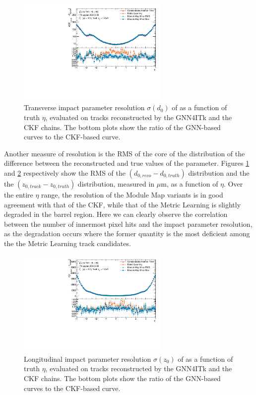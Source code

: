 \begin{figure}[h!]
\centering
    \centering
    \includegraphics[width=0.65\textwidth]{figures/ckf-gnn/Matched/Resolutions/Primary/resolution_vs_eta_d0.pdf}
    \caption{  Transverse impact parameter resolution $\sigma(d_0)$ of as a function of truth $\eta$, evaluated on tracks reconstructed by the GNN4ITk and the CKF chains. The bottom plots show the ratio of the GNN-based curves to the CKF-based curve. }
    \label{fig:res-vs-eta-d0}
\end{figure}

Another measure of resolution is the RMS of the core of the distribution of the difference between the reconstructed and true values of the parameter. 
Figures \ref{fig:res-vs-eta-d0} and \ref{fig:res-vs-eta-z0} respectively show the RMS of the $(d_{0,reco} - d_{0,truth})$ distribution and the the $(z_{0,track} - z_{0,truth})$ distribution, measured in $\mu$m, as a function of $\eta$. 
Over the entire $\eta$ range, the resolution of the Module Map variants is in good agreement with that of the CKF, while that of the Metric Learning is slightly degraded in the barrel region. 
Here we can clearly observe the correlation between the number of innermost pixel hits and the impact parameter resolution, as the degradation occurs where the former quantity is the most deficient among the the Metric Learning track candidates.

\begin{figure}[h!]
\centering
    \centering
    \includegraphics[width=0.65\textwidth]{figures/ckf-gnn/Matched/Resolutions/Primary/resolution_vs_eta_z0.pdf}
    \caption{Longitudinal impact parameter resolution $\sigma(z_0)$ of as a function of truth $\eta$, evaluated on tracks reconstructed by the GNN4ITk and the CKF chains. The bottom plots show the ratio of the GNN-based curves to the CKF-based curve.}
    \label{fig:res-vs-eta-z0}
\end{figure}

